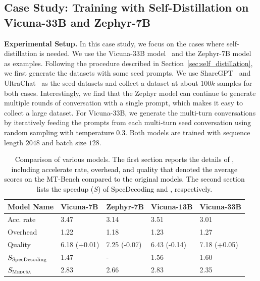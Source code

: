 \subsection{Case Study: Training with Self-Distillation on Vicuna-33B and Zephyr-7B}
\textbf{Experimental Setup.}
In this case study, we focus on the cases where self-distillation is needed. We use the Vicuna-33B model~\citep{vicuna2023} and the Zephyr-7B model~\citep{tunstall2023zephyr} as examples. Following the procedure described in Section~\ref{sec:self_distillation}, we first generate the datasets with some seed prompts. We use ShareGPT~\citep{sharegpt2023} and UltraChat~\citep{ding2023enhancing} as the seed datasets and collect a dataset at about $100k$ samples for both cases. Interestingly, we find that the Zephyr model can continue to generate multiple rounds of conversation with a single prompt, which makes it easy to collect a large dataset. 
For Vicuna-33B, we generate the multi-turn conversations by iteratively feeding the prompts from each multi-turn seed conversation \textcolor{black}{using random sampling with temperature 0.3}. Both models are trained with sequence length $2048$ and batch size $128$. 
\begin{table}[h]
\centering
\scriptsize
\begin{tabular}{@{}lllll@{}}
\toprule
Model Name & Vicuna-7B & Zephyr-7B & Vicuna-13B & Vicuna-33B \\ \midrule
Acc. rate   & 3.47      & 3.14      & 3.51       & 3.01       \\ 
Overhead   & 1.22      & 1.18      & 1.23       & 1.27       \\ 
Quality    & 6.18 (+0.01) & 7.25 (-0.07) & 6.43 (-0.14) & 7.18 (+0.05) \\ \midrule
$S_{\textnormal{SpecDecoding}}$ & 1.47 & - & 1.56 & 1.60 \\
$S_\textsc{Medusa}$ & 2.83 & 2.66 & 2.83 & 2.35\\\bottomrule
\end{tabular}
\caption{Comparison of various  models. 
\textcolor{black}{The first section reports the details of , including accelerate rate, overhead, and quality that denoted the average scores on the MT-Bench \textcolor{black}{compared to the original models}. The second section lists the speedup ($S$) of SpecDecoding and \ours, respectively.}
}


\label{tab:all_model_results}
\end{table}

